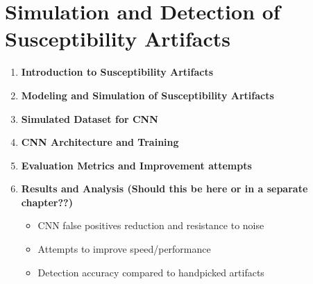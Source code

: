 \chapter{Simulation and Detection of Susceptibility Artifacts}
\label{ch:simulation-and-detection}

\begin{enumerate}
    \item \textbf{Introduction to Susceptibility Artifacts}
    \item \textbf{Modeling and Simulation of Susceptibility Artifacts}
    \item \textbf{Simulated Dataset for CNN}
    \item \textbf{CNN Architecture and Training}
    \item \textbf{Evaluation Metrics and Improvement attempts}
    \item \textbf{Results and Analysis (Should this be here or in a separate chapter??)}
        \begin{itemize} 
            \item CNN false positives reduction and resistance to noise
            \item Attempts to improve speed/performance
            \item Detection accuracy compared to handpicked artifacts
        \end{itemize}
\end{enumerate}
